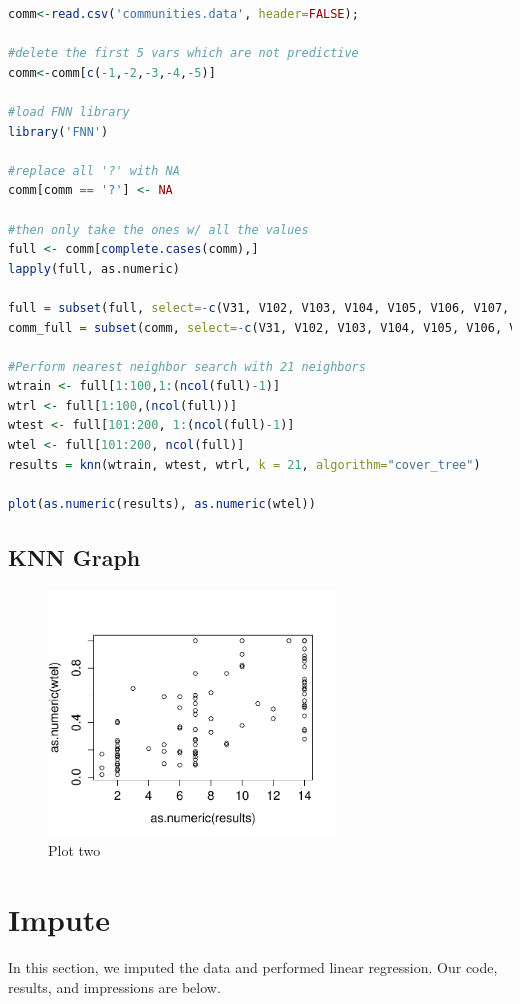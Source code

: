 \documentclass{article}
\begin{document}
\begin{lstlisting}[language=r]
comm<-read.csv('communities.data', header=FALSE);

#delete the first 5 vars which are not predictive
comm<-comm[c(-1,-2,-3,-4,-5)] 

#load FNN library
library('FNN')

#replace all '?' with NA
comm[comm == '?'] <- NA

#then only take the ones w/ all the values
full <- comm[complete.cases(comm),]
lapply(full, as.numeric)

full = subset(full, select=-c(V31, V102, V103, V104, V105, V106, V107, V108, V109, V111, V110, V112, V113, V114, V115, V116, V117, V118, V122, V123, V124, V125, V127))
comm_full = subset(comm, select=-c(V31, V102, V103, V104, V105, V106, V107, V108, V109, V111, V110, V112, V113, V114, V115, V116, V117, V118, V122, V123, V124, V125, V127))

#Perform nearest neighbor search with 21 neighbors
wtrain <- full[1:100,1:(ncol(full)-1)]
wtrl <- full[1:100,(ncol(full))]
wtest <- full[101:200, 1:(ncol(full)-1)]
wtel <- full[101:200, ncol(full)]
results = knn(wtrain, wtest, wtrl, k = 21, algorithm="cover_tree")

plot(as.numeric(results), as.numeric(wtel))
\end{lstlisting}

\subsection{KNN Graph}
\begin{figure}[H]
\centering
\includegraphics[width=3.0in]{knn.pdf}
\caption{Plot two}\label{fig_container} 
\end{figure}

\section{Impute}
In this section, we imputed the data and performed linear regression. Our code, results, and impressions are below. 
\end{document}
